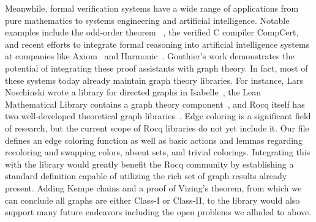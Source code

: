 Meanwhile, formal verification systems have a wide range of applications from pure mathematics to systems engineering and artificial intelligence. Notable examples include the odd-order theorem ~\cite{groupTheory}, the verified C compiler CompCert\cite{compCert}, and recent efforts to integrate formal reasoning into artificial intelligence systems at companies like Axiom~\cite{axiom} and Harmonic~\cite{harmonic}. Gonthier's work demonstrates the potential of integrating these proof assistants with graph theory. In fact, most of these systems today already maintain graph theory libraries. For instance, Lars Noschinski wrote a library for directed graphs in Isabelle~\cite{graphLibIzzy}, the Lean Mathematical Library contains a graph theory component~\cite{mathlib}, and Rocq itself has two well-developed theoretical graph libraries~\cite{mathcomp, graphLibRock}. Edge coloring is a significant field of research, but the current scope of Rocq libraries do not yet include it. Our  file defines an edge coloring function as well as basic actions and lemmas regarding recoloring and swapping colors, absent sets, and trivial colorings. Integrating this with the library would greatly benefit the Rocq community by establishing a standard definition capable of utilizing the rich set of graph results already present. Adding Kempe chains and a proof of Vizing's theorem, from which we can conclude all graphs are either Class-I or Class-II, to the library would also support many future endeavors including the open problems we alluded to above.


